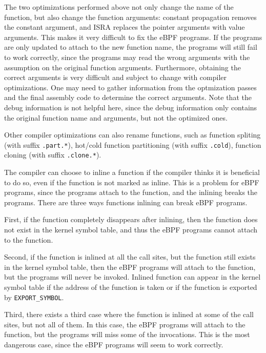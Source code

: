 The two optimizations performed above not only change the name of the function, but also change the function arguments: constant propagation removes the constant argument, and ISRA replaces the pointer arguments with value arguments.
This makes it very difficult to fix the eBPF programs.
If the programs are only updated to attach to the new function name, the programs will still fail to work correctly, since the programs may read the wrong arguments with the assumption on the original function arguments.
Furthermore, obtaining the correct arguments is very difficult and subject to change with compiler optimizations. One may need to gather information from the optmization passes and the final assembly code to determine the correct arguments.
Note that the debug information is not helpful here, since the debug information only contains the original function name and arguments, but not the optimized ones.

Other compiler optimizations can also rename functions, such as function spliting (with suffix \texttt{.part.*}), hot/cold function partitioning (with suffix \texttt{.cold}), function cloning (with suffix \texttt{.clone.*}).





The compiler can choose to inline a function if the compiler thinks it is beneficial to do so, even if the function is not marked as inline.
This is a problem for eBPF programs, since the programs attach to the function, and the inlining breaks the programs.
There are three ways functions inlining can break eBPF programs.

First, if the function completely disappears after inlining, then the function does not exist in the kernel symbol table, and thus the eBPF programs cannot attach to the function.

Second, if the function is inlined at all the call sites, but the function still exists in the kernel symbol table, then the eBPF programs will attach to the function, but the programs will never be invoked. Inlined function can appear in the kernel symbol table if the address of the function is taken or if the function is exported by \texttt{EXPORT\_SYMBOL}.

Third, there exists a third case where the function is inlined at some of the call sites, but not all of them. In this case, the eBPF programs will attach to the function, but the programs will miss some of the invocations. This is the most dangerous case, since the eBPF programs will seem to work correctly.

